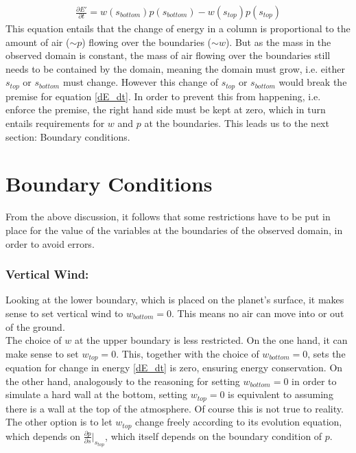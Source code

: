 \begin{align}\label{dE_dt}
\frac{\partial E'}{\partial t} = w(s_{bottom})p(s_{bottom})-w(s_{top})p(s_{top})
\end{align}
This equation entails that the change of energy in a column is proportional to the amount of air ($\sim p$) flowing over the boundaries ($\sim w$).
But as the mass in the observed domain is constant, the mass of air flowing over the boundaries still needs to be contained by the domain, meaning the domain must grow, i.e. either $s_{top}$ or $s_{bottom}$ must change.
However this change of $s_{top}$ or $s_{bottom}$ would break the premise for equation \ref{dE_dt}.
In order to prevent this from happening, i.e. enforce the premise, the right hand side must be kept at zero, which in turn entails requirements for $w$ and $p$ at the boundaries.
This leads us to the next section: Boundary conditions.


\section{Boundary Conditions}\label{sec:boundary}
From the above discussion, it follows that some restrictions have to be put in place for the value of the variables at the boundaries of the observed domain, in order to avoid errors.
\subsubsection{Vertical Wind:}
Looking at the lower boundary, which is placed on the planet's surface, it makes sense to set vertical wind to $w_{bottom}=0$.
This means no air can move into or out of the ground.\\
The choice of $w$ at the upper boundary is less restricted.
On the one hand, it can make sense to set $w_{top}=0$.
This, together with the choice of $w_{bottom}=0$, sets the equation for change in energy \ref{dE_dt} is zero, ensuring energy conservation.
On the other hand, analogously to the reasoning for setting $w_{bottom}=0$ in order to simulate a hard wall at the bottom, setting $w_{top}=0$ is equivalent to assuming there is a wall at the top of the atmosphere.
Of course this is not true to reality.\\
The other option is to let $w_{top}$ change freely according to its evolution equation, which depends on $\frac{\partial p}{\partial s}\rvert _{s_{top}}$, which itself depends on the boundary condition of $p$.
